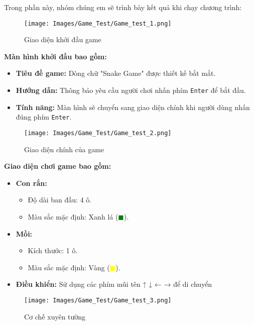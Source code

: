 \vspace{0.3cm}
\noindent Trong phần này, nhóm chúng em sẽ trình bày kết quả khi chạy chương trình:

\begin{figure}[H]
    \centering
    \texttt{[image: Images/Game\_Test/Game\_test\_1.png]}
    \caption{Giao diện khởi đầu game}
    \label{fig:game_test_1}
\end{figure}

\noindent \textbf{Màn hình khởi đầu bao gồm:}
\begin{itemize}
    \itemsep0.2cm
    \item \textbf{Tiêu đề game:} Dòng chữ "Snake Game" được thiết kế bắt mắt.
    \item \textbf{Hướng dẫn:} Thông báo yêu cầu người chơi nhấn phím \texttt{Enter} để bắt đầu.
    \item \textbf{Tính năng:} Màn hình sẽ chuyển sang giao diện chính khi người dùng nhấn đúng phím \texttt{Enter}.
\end{itemize}

\vspace{0.5cm}
\begin{figure}[H]
    \centering
    \texttt{[image: Images/Game\_Test/Game\_test\_2.png]}
    \caption{Giao diện chính của game}
    \label{fig:game_test_2}
\end{figure}

\noindent \textbf{Giao diện chơi game bao gồm:}
\begin{itemize}
    \itemsep0.2cm
    \item \textbf{Con rắn:} 
    \begin{itemize}
        \item Độ dài ban đầu: 4 ô.
        \item Màu sắc mặc định: Xanh lá (\textcolor{green}{$\blacksquare$}).
    \end{itemize}
    \item \textbf{Mồi:}
    \begin{itemize}
        \item Kích thước: 1 ô.
        \item Màu sắc mặc định: Vàng (\textcolor{yellow}{$\blacksquare$}).
    \end{itemize}
    \item \textbf{Điều khiển:} Sử dụng các phím mũi tên ↑ ↓ ← → để di chuyển
\end{itemize}

\vspace{0.5cm}
\begin{figure}[H]
    \centering
    \texttt{[image: Images/Game\_Test/Game\_test\_3.png]}
    \caption{Cơ chế xuyên tường}
    \label{fig:game_test_3}
\end{figure}


